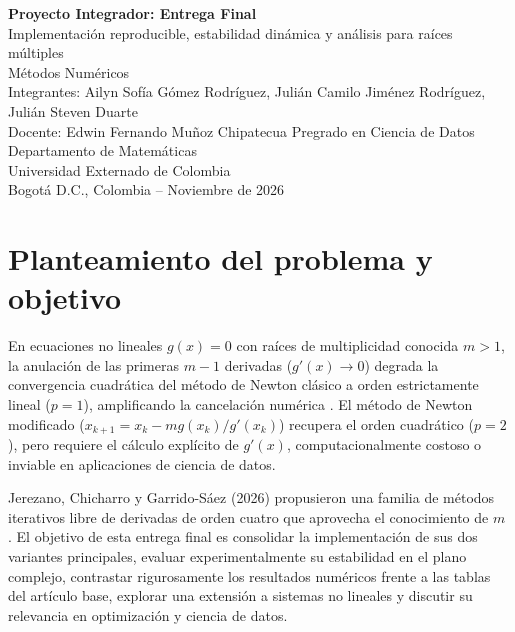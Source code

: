\documentclass[10pt,a4paper]{article}
\begin{document}
\begin{titlepage}\centering\vspace*{2cm}
{\LARGE\bfseries Proyecto Integrador: Entrega Final}\\[.5cm]
{\large Implementación reproducible, estabilidad dinámica y análisis para raíces múltiples}\\[.6cm]
{\Large Métodos Numéricos}\\[2cm]
Integrantes: Ailyn Sofía Gómez Rodríguez, Julián Camilo Jiménez Rodríguez, Julián Steven Duarte\\[1cm]
Docente: Edwin Fernando Muñoz Chipatecua\vfill 
Pregrado en Ciencia de Datos\\
Departamento de Matemáticas\\
Universidad Externado de Colombia\\
Bogotá D.C., Colombia -- Noviembre de 2026
\end{titlepage}

\section{Planteamiento del problema y objetivo}
En ecuaciones no lineales $g(x)=0$ con raíces de multiplicidad conocida $m > 1$, la anulación de las primeras $m-1$ derivadas ($g'(x)\to 0$) degrada la convergencia cuadrática del método de Newton clásico a orden estrictamente lineal ($p=1$), amplificando la cancelación numérica \cite{turner}. El método de Newton modificado ($x_{k+1}=x_k - m g(x_k)/g'(x_k)$) recupera el orden cuadrático ($p=2$), pero requiere el cálculo explícito de $g'(x)$, computacionalmente costoso o inviable en aplicaciones de ciencia de datos.

Jerezano, Chicharro y Garrido-Sáez (2026) propusieron una familia de métodos iterativos libre de derivadas de orden cuatro que aprovecha el conocimiento de $m$ \cite{jerezano}. El objetivo de esta entrega final es consolidar la implementación de sus dos variantes principales, evaluar experimentalmente su estabilidad en el plano complejo, contrastar rigurosamente los resultados numéricos frente a las tablas del artículo base, explorar una extensión a sistemas no lineales y discutir su relevancia en optimización y ciencia de datos.
\end{document}
